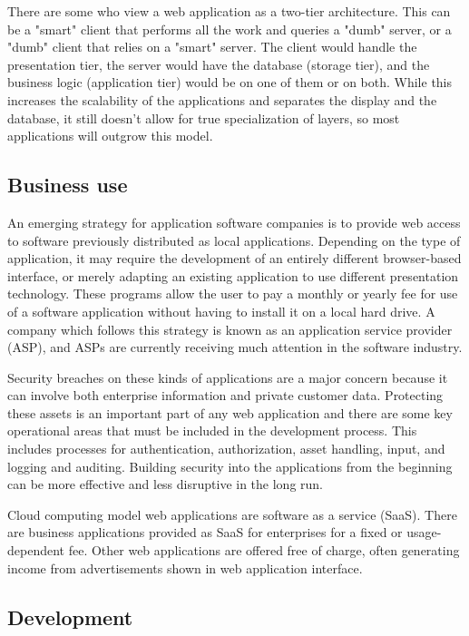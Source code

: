 There are some who view a web application as a two-tier architecture. This can be a "smart" client that performs all the work and queries a "dumb" server, or a "dumb" client that relies on a "smart" server. The client would handle the presentation tier, the server would have the database (storage tier), and the business logic (application tier) would be on one of them or on both.\cite{krunalMakeNtierArchitecture2008} While this increases the scalability of the applications and separates the display and the database, it still doesn't allow for true specialization of layers, so most applications will outgrow this model.

\subsection{Business use}

An emerging strategy for application software companies is to provide web access to software previously distributed as local applications. Depending on the type of application, it may require the development of an entirely different browser-based interface, or merely adapting an existing application to use different presentation technology. These programs allow the user to pay a monthly or yearly fee for use of a software application without having to install it on a local hard drive. A company which follows this strategy is known as an application service provider (ASP), and ASPs are currently receiving much attention in the software industry.

Security breaches on these kinds of applications are a major concern because it can involve both enterprise information and private customer data. Protecting these assets is an important part of any web application and there are some key operational areas that must be included in the development process. This includes processes for authentication, authorization, asset handling, input, and logging and auditing. Building security into the applications from the beginning can be more effective and less disruptive in the long run.

Cloud computing model web applications are software as a service (SaaS). There are business applications provided as SaaS for enterprises for a fixed or usage-dependent fee. Other web applications are offered free of charge, often generating income from advertisements shown in web application interface\cite{curtisfranklinjrTopTipsSecure2011}.

\subsection{Development}

